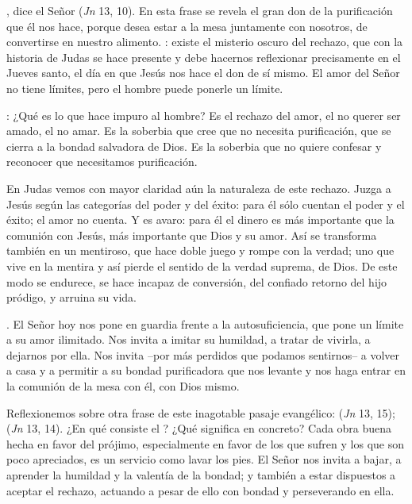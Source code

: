 \begin{body}
, dice el Señor (\textit{Jn} 13, 10). En esta frase se revela el gran don de la purificación que él nos hace, porque desea estar a la mesa juntamente con nosotros, de convertirse en nuestro alimento. : existe el misterio oscuro del rechazo, que con la historia de Judas se hace presente y debe hacernos reflexionar precisamente en el Jueves santo, el día en que Jesús nos hace el don de sí mismo. El amor del Señor no tiene límites, pero el hombre puede ponerle un límite.

: ¿Qué es lo que hace impuro al hombre? Es el rechazo del amor, el no querer ser amado, el no amar. Es la soberbia que cree que no necesita purificación, que se cierra a la bondad salvadora de Dios. Es la soberbia que no quiere confesar y reconocer que necesitamos purificación.

En Judas vemos con mayor claridad aún la naturaleza de este rechazo. Juzga a Jesús según las categorías del poder y del éxito: para él sólo cuentan el poder y el éxito; el amor no cuenta. Y es avaro: para él el dinero es más importante que la comunión con Jesús, más importante que Dios y su amor. Así se transforma también en un mentiroso, que hace doble juego y rompe con la verdad; uno que vive en la mentira y así pierde el sentido de la verdad suprema, de Dios. De este modo se endurece, se hace incapaz de conversión, del confiado retorno del hijo pródigo, y arruina su vida.

. El Señor hoy nos pone en guardia frente a la autosuficiencia, que pone un límite a su amor ilimitado. Nos invita a imitar su humildad, a tratar de vivirla, a dejarnos  por ella. Nos invita –por más perdidos que podamos sentirnos– a volver a casa y a permitir a su bondad purificadora que nos levante y nos haga entrar en la comunión de la mesa con él, con Dios mismo.

Reflexionemos sobre otra frase de este inagotable pasaje evangélico:  (\textit{Jn} 13, 15);  (\textit{Jn} 13, 14). ¿En qué consiste el ? ¿Qué significa en concreto? Cada obra buena hecha en favor del prójimo, especialmente en favor de los que sufren y los que son poco apreciados, es un servicio como lavar los pies. El Señor nos invita a bajar, a aprender la humildad y la valentía de la bondad; y también a estar dispuestos a aceptar el rechazo, actuando a pesar de ello con bondad y perseverando en ella.


\end{body}
